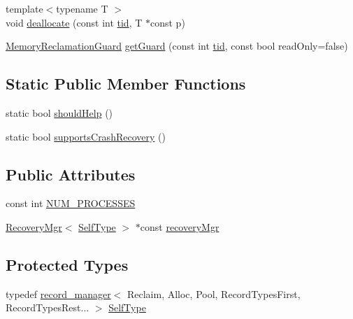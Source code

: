 \begin{DoxyCompactItemize}
\item 
{\footnotesize template$<$typename T $>$ }\\void \hyperlink{classrecord__manager_a31dfab27fb2e11e14566eb822dbb09ec}{deallocate} (const int \hyperlink{microbench_2main_8cpp_a9ca9869868fe7e7a38a921cc7de4103f}{tid}, T $\ast$const p)
\item 
\hyperlink{classrecord__manager_1_1MemoryReclamationGuard}{Memory\+Reclamation\+Guard} \hyperlink{classrecord__manager_a6c5b2928e4b2e9c9e88d2dc99a6bd609}{get\+Guard} (const int \hyperlink{microbench_2main_8cpp_a9ca9869868fe7e7a38a921cc7de4103f}{tid}, const bool read\+Only=false)
\end{DoxyCompactItemize}
\subsection*{Static Public Member Functions}
\begin{DoxyCompactItemize}
\item 
static bool \hyperlink{classrecord__manager_af3a8edecda7de21633ea71aa62a3a0b7}{should\+Help} ()
\item 
static bool \hyperlink{classrecord__manager_a1a93542bd25f1bf12db4c1c250b7e587}{supports\+Crash\+Recovery} ()
\end{DoxyCompactItemize}
\subsection*{Public Attributes}
\begin{DoxyCompactItemize}
\item 
const int \hyperlink{classrecord__manager_a142bc059fc2b171665a9aed59873de9a}{N\+U\+M\+\_\+\+P\+R\+O\+C\+E\+S\+S\+ES}
\item 
\hyperlink{classRecoveryMgr}{Recovery\+Mgr}$<$ \hyperlink{classrecord__manager_a294739c32aa84eb40b32090b45fdc137}{Self\+Type} $>$ $\ast$const \hyperlink{classrecord__manager_a8ac6e466002b613f70297007ca287c9d}{recovery\+Mgr}
\end{DoxyCompactItemize}
\subsection*{Protected Types}
\begin{DoxyCompactItemize}
\item 
typedef \hyperlink{classrecord__manager}{record\+\_\+manager}$<$ Reclaim, Alloc, Pool, Record\+Types\+First, Record\+Types\+Rest... $>$ \hyperlink{classrecord__manager_a294739c32aa84eb40b32090b45fdc137}{Self\+Type}
\end{DoxyCompactItemize}
